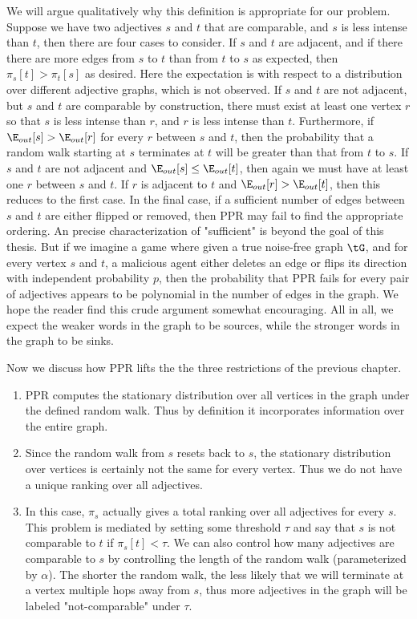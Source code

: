 We will argue qualitatively why this definition is appropriate for our problem. Suppose we have two adjectives $s$ and $t$ that are comparable, and $s$ is less intense than $t$, then there are four cases to consider. If $s$ and $t$ are adjacent, and if there there are more edges from $s$ to $t$ than from $t$ to $s$ as expected, then $\pi_s[t] > \pi_t[s]$ as desired. Here the expectation is with respect to a distribution over different adjective graphs, which is not observed. If $s$ and $t$ are not adjacent, but $s$ and $t$ are comparable by construction, there must exist at least one vertex $r$ so that $s$ is less intense than $r$, and $r$ is less intense than $t$. Furthermore, if $\E_{out}[s] > \E_{out}[r]$ for every $r$ between $s$ and $t$, then the probability that a random walk starting at $s$ terminates at $t$ will be greater than that from $t$ to $s$. If $s$ and $t$ are not adjacent and $\E_{out}[s] \leq \E_{out}[t]$, then again we must have at least one $r$ between $s$ and $t$. If $r$ is adjacent to $t$ and $\E_{out}[r] > \E_{out}[t]$, then this reduces to the first case. In the final case, if a sufficient number of edges between $s$ and $t$ are either flipped or removed, then PPR may fail to find the appropriate ordering. An precise characterization of "sufficient" is beyond the goal of this thesis. But if we imagine a game where given a true noise-free graph $\tG$, and for every vertex $s$ and $t$, a malicious agent either deletes an edge or flips its direction with independent probability $p$, then the probability that PPR fails for every pair of adjectives appears to be polynomial in the number of edges in the graph. We hope the reader find this crude argument somewhat encouraging. All in all, we expect the weaker words in the graph to be sources, while the stronger words in the graph to be sinks. 

Now we discuss how PPR lifts the the three restrictions of the previous chapter. 

\begin{enumerate}
\item PPR computes the stationary distribution over all vertices in the graph under the defined random walk. Thus by definition it incorporates information over the entire graph.
\item Since the random walk from $s$ resets back to $s$, the stationary distribution over vertices is certainly not the same for every vertex. Thus we do not have a unique ranking over all adjectives.
\item In this case, $\pi_s$ actually gives a total ranking over all adjectives for every $s$. This problem is mediated by setting some threshold $\tau$ and say that $s$ is not comparable to $t$ if $\pi_s[t] < \tau$. We can also control how many adjectives are comparable to $s$ by controlling the length of the random walk (parameterized by $\alpha$). The shorter the random walk, the less likely that we will terminate at a vertex multiple hops away from $s$, thus more adjectives in the graph will be labeled "not-comparable" under $\tau$. 
\end{enumerate}

